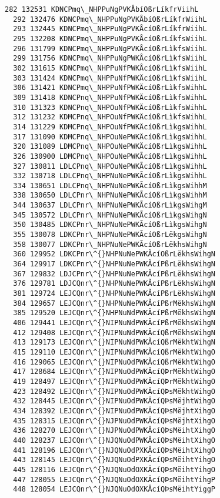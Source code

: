 \documentclass[11pt]{article}
\begin{document}
\begin{Verbatim}[commandchars=\\\{\}]
  282 132531 KDNCPmq\_NHPPuNgPVKÅbíOßrLíkfrViihL
  292 132476 KDNCPmq\_NHPPuNgPVKÅbíOßrLíkfrWiihL
  293 132445 KDNCPmq\_NHPPuNgPVKÅcíOßrLíkfrWiihL
  295 132208 KDNCPmq\_NHPPuNgPVKÅcíOßrLíkfsWiihL
  296 131799 KDNCPmq\_NHPPuNgPVKÅcíOßrLìkfsWiihL
  299 131756 KDNCPmq\_NHPPuNgPWKÅcíOßrLìkfsWiihL
  302 131615 KDNCPmq\_NHPPuNfPWKÅcíOßrLìkfsWiihL
  303 131424 KDNCPmq\_NHPPuNfPWKÄcíOßrLìkfsWiihL
  306 131421 KDNCPmq\_NHPPuNfPWKÄcíOßrLìkfsWihhL
  309 131418 KDNCPnq\_NHPPuNfPWKÄcíOßrLìkfsWihhL
  310 131323 KDNCPnq\_NHPOuNfPWKÄcíOßrLìkfsWihhL
  312 131232 KDMCPnq\_NHPOuNfPWKÄcíOßrLìkfsWihhL
  314 131229 KDMCPnq\_NHPOuNfPWKÄcíOßrLìkgsWihhL
  317 131090 KDMCPnq\_NHPOuNePWKÄcíOßrLìkgsWihhL
  320 131089 LDMCPnq\_NHPOuNePWKÄcíOßrLìkgsWihhL
  326 130900 LDMCPnq\_NHPOuNePWKÃcíOßrLìkgsWihhL
  327 130811 LDLCPnq\_NHPOuNePWKÃcíOßrLìkgsWihhL
  332 130718 LDLCPnq\_NHPNuNePWKÃcíOßrLìkgsWihhL
  334 130651 LDLCPnq\_NHPNuNePWKÃcíOßrLìkgsWihhM
  338 130650 LDLCPnr\_NHPNuNePWKÃcíOßrLìkgsWihhM
  344 130637 LDLCPnr\_NHPNuNePWKÃcíOßrLìkgsWihgM
  345 130572 LDLCPnr\_NHPNuNePWKÃcíOßrLìkgsWihgN
  350 130485 LDKCPnr\_NHPNuNePWKÃcíOßrLìkgsWihgN
  355 130078 LDKCPnr\_NHPNuNePWKÃcíOßrLëkgsWihgN
  358 130077 LDKCPnr\_NHPNuNePWKÃcíOßrLëkhsWihgN
  360 129952 LDKCPnr\^{}NHPNuNePWKÃcíOßrLëkhsWihgN
  364 129917 LDKCPnr\^{}NHPNuNePWKÃcíPßrLëkhsWihgN
  367 129832 LDJCPnr\^{}NHPNuNePWKÃcíPßrLëkhsWihgN
  376 129781 LDJCQnr\^{}NHPNuNePWKÃcíPßrLëkhsWihgN
  381 129724 LEJCQnr\^{}NHPNuNePWKÃcíPßrLëkhsWihgN
  384 129657 LEJCQnr\^{}NHPNuNePWKÃcíPßrMëkhsWihgN
  385 129520 LEJCQnr\^{}NHPNuNdPWKÃcíPßrMëkhsWihgN
  406 129441 LEJCQnr\^{}NIPNuNdPWKÃcíPßrMëkhsWihgN
  412 129408 LEJCQnr\^{}NIPNuNdPWKÃcíQßrMëkhsWihgN
  413 129173 LEJCQnr\^{}NIPNuNdPWKÃcíQßrMëkhtWihgN
  415 129110 LEJCQnr\^{}NIPNuNdPWKÃcíQßrMëkhtWihgO
  416 129065 LEJCQnr\^{}NIPNuOdPWKÃcíQßrMëkhtWihgO
  417 128684 LEJCQnr\^{}NIPNuOdPWKÃcíQÞrMëkhtWihgO
  419 128497 LEJCQnr\^{}NIPNuOdPWKÂcíQÞrMëkhtWihgO
  423 128492 LEJCQnr\^{}NIPNuOdPWKÂcíQÞsMëkhtWihgO
  432 128445 LEJCQnr\^{}NIPNuOdPWKÂcíQÞsMëjhtWihgO
  434 128392 LEJCQnr\^{}NIPNuOdPWKÂcíQÞsMëjhtXihgO
  435 128315 LEJCQnr\^{}NJPNuOdPWKÂcíQÞsMëjhtXihgO
  436 128270 LEJCQnr\^{}NJPNuOdPWKÂcíQÞsMëihtXihgO
  440 128237 LEJCQnr\^{}NJQNuOdPWKÂcíQÞsMëihtXihgO
  441 128196 LEJCQnr\^{}NJQNuOdPXKÂcíQÞsMëihtXihgO
  443 128145 LEJCQnr\^{}NJQNuOdPXKÂcíQÞsMëihtYihgO
  445 128116 LEJCQnr\^{}NJQNuOdOXKÂcíQÞsMëihtYihgO
  447 128055 LEJCQnr\^{}NJQNuOdOXKÂcíQÞsMëihtYihgP
  448 128054 LEJCQnr\^{}NJQNuOdOXKÂcíQÞsMëihtYiggP

\end{Verbatim}
\end{document}
